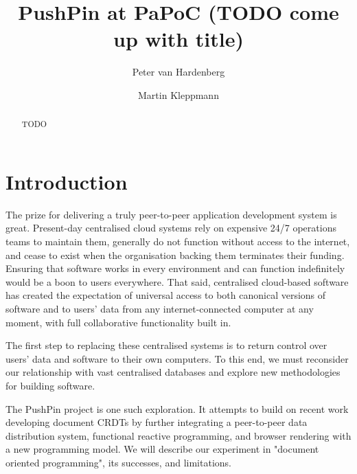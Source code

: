 \documentclass[sigplan,10pt]{acmart}
\begin{document}
\title{PushPin at PaPoC (TODO come up with title)}

\author{Peter van Hardenberg}

\author{Martin Kleppmann}

\begin{abstract}
    TODO
\end{abstract}

\maketitle

\section{Introduction}

The prize for delivering a truly peer-to-peer application development system is great. Present-day centralised cloud systems rely on expensive 24/7 operations teams to maintain them, generally do not function without access to the internet, and cease to exist when the organisation backing them terminates their funding. Ensuring that software works in every environment and can function indefinitely would be a boon to users everywhere. That said, centralised cloud-based software has created the expectation of universal access to both canonical versions of software and to users' data from any internet-connected computer at any moment, with full collaborative functionality built in.

The first step to replacing these centralised systems is to return control over users' data and software to their own computers. To this end, we must reconsider our relationship with vast centralised databases and explore new methodologies for building software.

The PushPin project is one such exploration. It attempts to build on recent work developing document CRDTs by further integrating a peer-to-peer data distribution system, functional reactive programming, and browser rendering with a new programming model. We will describe our experiment in "document oriented programming", its successes, and limitations.
\end{document}
